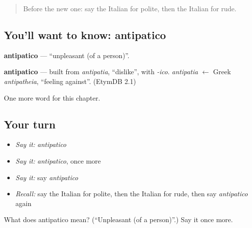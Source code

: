\label{lesson:IT-C156-antipatico}



\begin{quote}
Before the new one: say the Italian for polite, then the Italian for rude.
\end{quote}

\subsection*{You'll want to know: antipatico}
\textbf{antipatico} — \textquotedblleft{}unpleasant (of a person)\textquotedblright{}.

\begin{cousinweb}
\textbf{antipatico} — built from \emph{antipatia}, \textquotedblleft{}dislike\textquotedblright{}, with \emph{-ico}. \emph{antipatia} $\leftarrow$ Greek \emph{antipatheia}, \textquotedblleft{}feeling against\textquotedblright{}. (EtymDB 2.1)
\end{cousinweb}

\begin{grammarlens}[title={What you've built}]
One more word for this chapter.
\end{grammarlens}

\subsection*{Your turn}
\begin{itemize}
\raggedright
  \item \emph{Say it:} \emph{antipatico}
  \item \emph{Say it:} \emph{antipatico}, once more
  \item \emph{Say it:} say \emph{antipatico}
  \item \emph{Recall:} say the Italian for polite, then the Italian for rude, then say \emph{antipatico} again
\end{itemize}

\begin{tcolorbox}[breakable,colback=teal!4,colframe=teal!35!black,title={Before you move on}]
What does antipatico mean? (\textquotedblleft{}Unpleasant (of a person)\textquotedblright{}.) Say it once more.
\end{tcolorbox}
